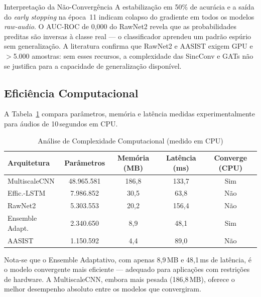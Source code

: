 \documentclass[12pt,a4paper]{article}
\begin{document}
\begin{infobox}{Interpreta\c{c}\~{a}o da N\~{a}o-Converg\^{e}ncia}
A estabiliza\c{c}\~{a}o em 50\% de acur\'{a}cia e a sa\'{i}da do
\textit{early stopping} na \'{e}poca~11 indicam colapso do gradiente em todos
os modelos \textit{raw-audio}.
O AUC-ROC de 0,000 do RawNet2 revela que as probabilidades preditas s\~{a}o
inversas \`{a} classe real --- o classificador aprendeu um padr\~{a}o
espúrio sem generaliza\c{c}\~{a}o.
A literatura confirma que RawNet2 e AASIST exigem GPU e $>$5.000 amostras:
sem esses recursos, a complexidade das SincConv e GATs n\~{a}o se justifica
para a capacidade de generaliza\c{c}\~{a}o dispon\'{i}vel.
\end{infobox}

\subsection{Efici\^{e}ncia Computacional}

A Tabela~\ref{tab:complexidade} compara par\^{a}metros, mem\'{o}ria e
lat\^{e}ncia medidas experimentalmente para \'{a}udios de 10\,segundos
em CPU.

\begin{table}[H]
\centering
\caption{An\'{a}lise de Complexidade Computacional (medido em CPU)}
\label{tab:complexidade}
\begin{tabular}{lcccc}
\toprule
\textbf{Arquitetura} & \textbf{Par\^{a}metros} &
\textbf{Mem\'{o}ria (MB)} & \textbf{Lat\^{e}ncia (ms)} &
\textbf{Converge (CPU)} \\
\midrule
MultiscaleCNN & 48.965.581 & 186,8 & 133,7 & \textcolor{successgreen}{Sim} \\
Effic.-LSTM & 7.986.852 & 30,5 & 63,8 & \textcolor{dangerred}{N\~{a}o} \\
RawNet2 & 5.303.553 & 20,2 & 156,4 & \textcolor{dangerred}{N\~{a}o} \\
Ensemble Adapt. & 2.340.650 & 8,9 & 48,1 & \textcolor{successgreen}{Sim} \\
AASIST & 1.150.592 & 4,4 & 89,0 & \textcolor{dangerred}{N\~{a}o} \\
\bottomrule
\end{tabular}
\end{table}

Nota-se que o Ensemble Adaptativo, com apenas 8,9\,MB e 48,1\,ms de
lat\^{e}ncia, \'{e} o modelo convergente mais eficiente --- adequado para
aplica\c{c}\~{o}es com restri\c{c}\~{o}es de hardware.
A MultiscaleCNN, embora mais pesada (186,8\,MB), oferece o melhor desempenho
absoluto entre os modelos que convergiram.
\end{document}

